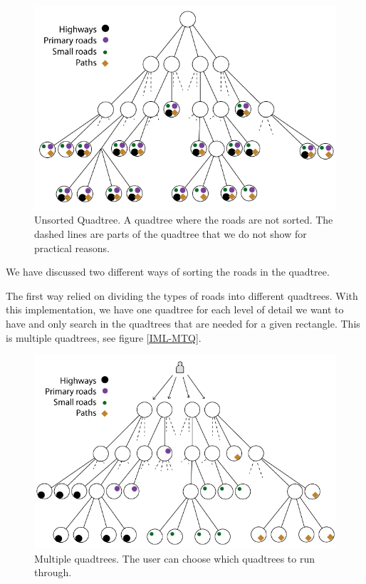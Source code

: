 \begin{figure}[h!]
\centering
\includegraphics[width=1\linewidth]{images/UnsortedQuadtree.png}
\caption{Unsorted Quadtree. A quadtree where the roads are not sorted. The
dashed lines are parts of the quadtree that we do not show for practical
reasons.}
\label{IMPL-USQ}
\end{figure}

We have discussed two different ways of sorting the roads in the quadtree. 

The first way relied on dividing the types of roads into different
quadtrees. With this implementation, we have one quadtree for each level of
detail we want to have and only search in the quadtrees that are needed for a
given rectangle. This is multiple quadtrees, see figure \ref{IML-MTQ}.

\begin{figure}[h!]
\centering
\includegraphics[width=1\linewidth]{images/MultiQuadtree.png}
\caption{Multiple quadtrees. The user can choose which quadtrees to run
through.}
\label{IMPL-DCMQ}
\end{figure}

